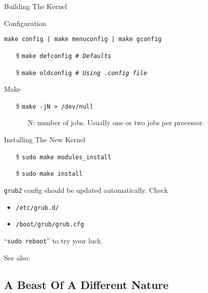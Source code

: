\begin{frame}{Building The Kernel}
  \begin{block}{Configuration}
    \begin{center}
      \texttt{make config | make menuconfig | make gconfig}
    \end{center}
    \begin{itemize}
    \item[\$] \texttt{make defconfig \emph{\# Defaults}}
    \item[\$] \texttt{make oldconfig \emph{\# Using .config file}}
    \end{itemize}
  \end{block}
  \begin{block}{Make}
    \begin{itemize}
    \item[\$] \texttt{make -jN > /dev/null}
      \begin{itemize}
      \item[N:] number of jobs. Usually one or two jobs per processor.
      \end{itemize}
    \end{itemize}
  \end{block}
\end{frame}

\begin{frame}
  \begin{block}{Installing The New Kernel}
    \begin{itemize}
    \item[\$] \texttt{sudo make modules\_install}
    \item[\$] \texttt{sudo make install}
    \end{itemize}
    \texttt{grub2} config should be updated automatically. Check
    \begin{itemize}
    \item \texttt{/etc/grub.d/}
    \item \texttt{/boot/grub/grub.cfg}
    \end{itemize}
    ``\texttt{sudo reboot}'' to try your luck.
  \end{block}
\end{frame}

See also: 

\subsection{A Beast Of A Different Nature}

